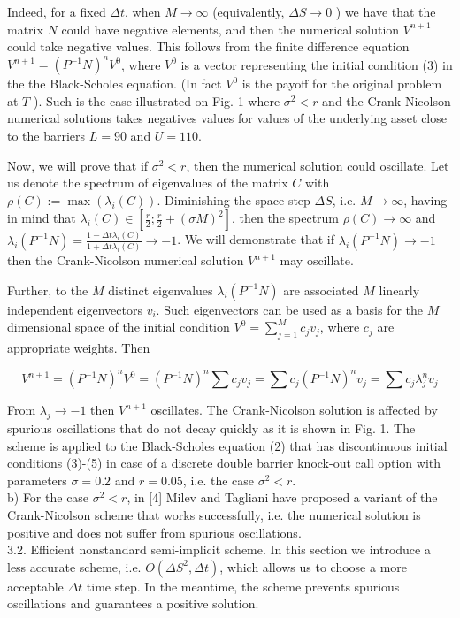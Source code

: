 \documentclass[10pt]{article}
\begin{document}
Indeed, for a fixed $\Delta t$, when $M \rightarrow \infty$ (equivalently, $\Delta S \rightarrow 0$ ) we have that the matrix $N$ could have negative elements, and then the numerical solution $V^{n+1}$ could take negative values. This follows from the finite difference equation $V^{n+1}=\left(P^{-1} N\right)^{n} V^{0}$, where $V^{0}$ is a vector representing the initial condition (3) in the the Black-Scholes equation. (In fact $V^{0}$ is the payoff for the original problem at $T$ ). Such is the case illustrated on Fig. 1 where $\sigma^{2}<r$ and the Crank-Nicolson numerical solutions takes negatives values for values of the underlying asset close to the barriers $L=90$ and $U=110$.

Now, we will prove that if $\sigma^{2}<r$, then the numerical solution could oscillate. Let us denote the spectrum of eigenvalues of the matrix $C$ with $\rho(C):= \max \left(\lambda_{i}(C)\right)$. Diminishing the space step $\Delta S$, i.e. $M \rightarrow \infty$, having in mind that $\lambda_{i}(C) \in\left[\frac{r}{2} ; \frac{r}{2}+(\sigma M)^{2}\right]$, then the spectrum $\rho(C) \rightarrow \infty$ and $\lambda_{i}\left(P^{-1} N\right)= \frac{1-\Delta t \lambda_{i}(C)}{1+\Delta t \lambda_{i}(C)} \rightarrow-1$. We will demonstrate that if $\lambda_{i}\left(P^{-1} N\right) \rightarrow-1$ then the Crank-Nicolson numerical solution $V^{n+1}$ may oscillate.

Further, to the $M$ distinct eigenvalues $\lambda_{i}\left(P^{-1} N\right)$ are associated $M$ linearly independent eigenvectors $v_{i}$. Such eigenvectors can be used as a basis for the $M$ dimensional space of the initial condition $V^{0}=\sum_{j=1}^{M} c_{j} v_{j}$, where $c_{j}$ are appropriate weights. Then

$$
V^{n+1}=\left(P^{-1} N\right)^{n} V^{0}=\left(P^{-1} N\right)^{n} \sum c_{j} v_{j}=\sum c_{j}\left(P^{-1} N\right)^{n} v_{j}=\sum c_{j} \lambda_{j}^{n} v_{j}
$$

From $\lambda_{j} \rightarrow-1$ then $V^{n+1}$ oscillates. The Crank-Nicolson solution is affected by spurious oscillations that do not decay quickly as it is shown in Fig. 1. The scheme is applied to the Black-Scholes equation (2) that has discontinuous initial conditions (3)-(5) in case of a discrete double barrier knock-out call option with parameters $\sigma=0.2$ and $r=0.05$, i.e. the case $\sigma^{2}<r$.\\
b) For the case $\sigma^{2}<r$, in [4] Milev and Tagliani have proposed a variant of the Crank-Nicolson scheme that works successfully, i.e. the numerical solution is positive and does not suffer from spurious oscillations.\\
3.2. Efficient nonstandard semi-implicit scheme. In this section we introduce a less accurate scheme, i.e. $O\left(\Delta S^{2}, \Delta t\right)$, which allows us to choose a more acceptable $\Delta t$ time step. In the meantime, the scheme prevents spurious oscillations and guarantees a positive solution.
\end{document}
